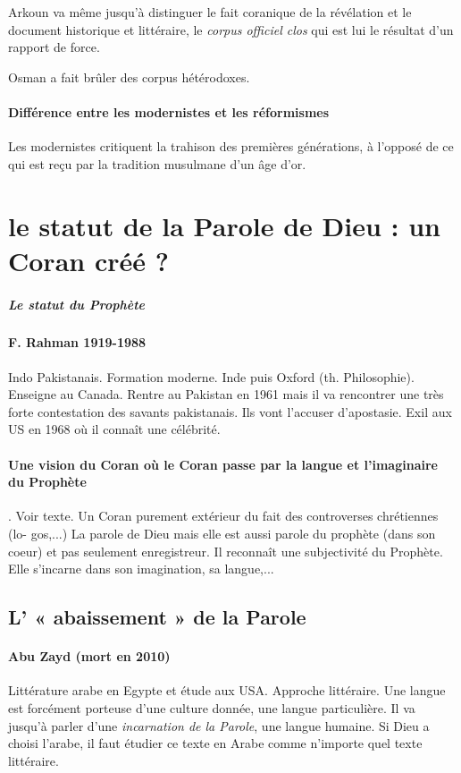 Arkoun va même jusqu'à distinguer le fait coranique de la révélation et le document historique et littéraire, le \textit{corpus officiel clos} qui est lui le résultat d'un rapport de force. 
\begin{Ex}
Osman a fait brûler des corpus hétérodoxes.
\end{Ex}


\paragraph{Différence entre les modernistes et les réformismes} Les modernistes critiquent la trahison des premières générations, à l'opposé de ce qui est reçu par la tradition musulmane d'un âge d'or.



\section{le statut de la Parole de Dieu : un Coran créé ?}



\subparagraph{Le statut du Prophète }

\paragraph{F. Rahman 1919-1988} Indo Pakistanais. Formation moderne. Inde puis Oxford (th. Philosophie). Enseigne au Canada. Rentre au Pakistan en 1961 mais il va rencontrer une très forte contestation des savants pakistanais. Ils vont l'accuser d'apostasie. Exil aux US en 1968 où il connaît une célébrité.

\paragraph{Une vision du Coran où le Coran passe par la langue et l'imaginaire du Prophète}. Voir texte. Un Coran purement extérieur du fait des controverses chrétiennes (lo-
gos,...) La parole de Dieu mais elle est aussi parole du prophète (dans
son coeur) et pas seulement enregistreur. Il reconnaît une subjectivité du
Prophète. Elle s’incarne dans son imagination, sa langue,...



\subsection{L’ « abaissement » de la Parole }
\paragraph{Abu Zayd (mort en 2010)} Littérature arabe en Egypte et étude aux USA. Approche littéraire. Une langue est forcément porteuse d'une culture donnée, une langue particulière. Il va jusqu'à parler d'une \textit{incarnation de la Parole}, une langue humaine. Si Dieu a choisi l'arabe, il faut étudier ce texte en Arabe comme n'importe quel texte littéraire. 

